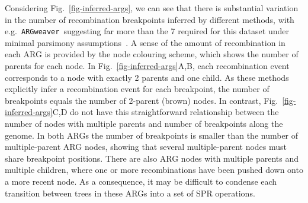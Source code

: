 \documentclass{article}
\newcommand{\tsinfer}[0]{\texttt{tsinfer}}
\newcommand{\argweaver}[0]{\texttt{ARGweaver}}
\newcommand{\relate}[0]{\texttt{Relate}}
\begin{document}
Considering Fig.~\ref{fig-inferred-args}, we can see that
there is substantial variation in the number of recombination breakpoints
inferred by different methods, with e.g.~\argweaver\ suggesting
far more than the 7 required for this dataset under minimal parsimony
assumptions~\citep{song2003parsimonious}.
A sense of the amount of recombination in each ARG is provided by
the node colouring scheme, which shows the number of parents for each node.
In Fig.~\ref{fig-inferred-args}A,B, each recombination event
corresponds to a node with exactly 2 parents and one child.
As these methods explicitly infer a recombination event for each
breakpoint, the number of breakpoints equals the number of 2-parent
(brown) nodes.
In contrast, Fig.~\ref{fig-inferred-args}C,D do not have this
straightforward
relationship between the number of nodes with multiple parents
and number of breakpoints along the genome.
In both ARGs the number of breakpoints is smaller
than the number of multiple-parent ARG nodes, showing
that several multiple-parent nodes must share breakpoint positions.
There are also ARG nodes with multiple parents and multiple children,
where one or more recombinations have been pushed down onto a
more recent node.
As a consequence, it may be difficult to condense each transition between trees
in these ARGs into a set of SPR operations.
\end{document}
